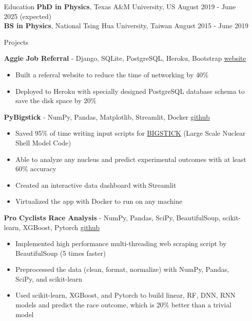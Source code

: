 \documentclass{resume}
\begin{document}
\vspace{-2.75em}
\begin{rSection}{Education}
{\bf PhD in Physics}, Texas A\&M University, US \hfill {August 2019 - June 2025 (expected)} \\
{\bf BS in Physics}, National Tsing Hua University, Taiwan \hfill {August 2015 - June 2019}
\vspace{-0.5em}


\begin{rSection}{Projects}
    \vspace{-1.25em}
    \item \textbf{Aggie Job Referral} - {Django, SQLite, PostgreSQL, Heroku, Bootstrap} \hfill {\href{https://boiling-hollows-75833.herokuapp.com/}{website}}
        \begin{itemize}
        \itemsep -3pt {}
        \item Built a referral website to reduce the time of networking by 40\%
        \item Deployed to Heroku with specially designed PostgreSQL database schema to save the disk space by 20\%
        \end{itemize}
    \item \textbf{PyBigstick} - {NumPy, Pandas, Matplotlib, Streamlit, Docker} \hfill {\href{https://github.com/noctildon/pyBigstick}{github}}
        \begin{itemize}
        \itemsep -3pt {}
        \item Saved 95\% of time writing input scripts for \href{https://github.com/cwjsdsu/BigstickPublick}{BIGSTICK} (Large Scale Nuclear Shell Model Code)
        \item Able to analyze any nucleus and predict experimental outcomes with at least 60\% accuracy
        \item Created an interactive data dashboard with Streamlit
        \item Virtualized the app with Docker to run on any machine
        \end{itemize}
    \item \textbf{Pro Cyclists Race Analysis} - {NumPy, Pandas, SciPy, BeautifulSoup, scikit-learn, XGBoost, Pytorch} \hfill {\href{https://github.com/noctildon/pro_cyclists}{github}}
        \begin{itemize}
        \itemsep -3pt {}
        \item Implemented high performance multi-threading web scraping script by BeautifulSoup (5 times faster)
        \item Preprocessed the data (clean, format, normalize) with NumPy, Pandas, SciPy, and scikit-learn
        \item Used scikit-learn, XGBoost, and Pytorch to build linear, RF, DNN, RNN models and predict the race outcome, which is 20\% better than a trivial model
        \end{itemize}
\end{rSection}




\end{rSection}
\end{document}
